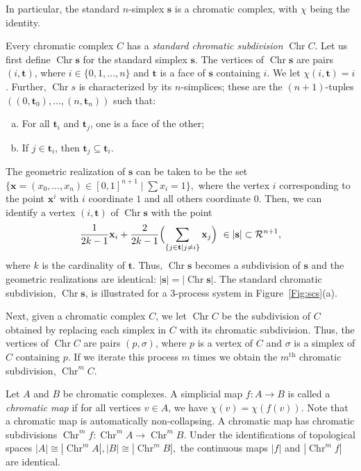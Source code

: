 \documentclass[a4paper]{article}
\def\R{\ensuremath{\mathcal{R}}}
\def\s {\mathbf{s}}
\def\t {\mathbf{t}}
\def\Chr{\operatorname{Chr}}
\def\x{\mathbf{x}}
\renewcommand\th{^{\text{th}}}
\begin{document}
In particular, the standard $n$-simplex $\s$ is a chromatic complex, with $\chi$ being the identity.

Every chromatic complex $C$ has a {\em standard chromatic subdivision} $\Chr C$. Let us first define $\Chr \s$
for the standard simplex $\s$. The vertices of $\Chr \s$ are pairs $(i, \t)$, where $i \in \{0,1 ,\dots, n\}$
and $\t$ is a face of $\s$ containing $i$. We let $\chi(i, \t) = i$. Further, $\Chr s$ is characterized by its
$n$-simplices; these are the $(n+1)$-tuples $((0,\t_0), \dots, (n, \t_n))$ such that:
\begin{enumerate}[(a)]
\item For all $\t_i$ and $\t_j$, one is a face of the other;
\item If $j \in \t_i$, then $\t_j \subseteq \t_i$. 
\end{enumerate} 
The geometric realization of $\s$ can be taken to be the set $\{\x=(x_0, \dots, x_n) \in [0,1]^{n+1} \mid \sum
x_i = 1\},$ where the vertex $i$ corresponding to the point $\x^i$ with $i$ coordinate $1$ and all others
coordinate $0$. Then, we can identify a vertex $(i, \t)$ of $\Chr \s$ with the point
\[
\frac{1}{2k-1} \x_i + \frac{2}{2k-1} \Bigl( \sum_{\{j \in \t \mid j \neq i\}} \x_j \Bigr) \ \in |\s| \subset
\R^{n+1},
\]
where $k$ is the cardinality of $\t$. 
Thus, $\Chr \s$ becomes a subdivision of $\s$ and the geometric realizations are identical: $|\s|=|\Chr \s|$. The standard chromatic subdivision, $\Chr\s$, is illustrated for a 3-process system in Figure~\ref{Fig:scs}(a).


Next, given a chromatic complex $C$, we let $\Chr C$ be the subdivision of $C$ obtained by replacing each
simplex in $C$ with its chromatic subdivision. Thus, the vertices of $\Chr C$ are pairs $(p, \sigma)$, where $p$
is a vertex of $C$ and $\sigma$ is a simplex of $C$ containing $p$. If we iterate this process  $m$ times we
obtain the $m\th$ chromatic subdivision, $\Chr^m C$.

Let $A$ and $B$ be chromatic complexes. A simplicial map $f: A \to B$ is called a {\em chromatic map} if for all
vertices $v \in A$, we have $\chi(v) = \chi(f(v))$. Note that a chromatic map is automatically non-collapsing. A
chromatic map has chromatic subdivisions $\Chr^m f: \Chr^m A \to \Chr^m B$. Under the identifications of
topological spaces $|A| \cong |\Chr^m A|, |B| \cong |\Chr^m B|,$ the continuous maps $|f|$ and $|\Chr^m f|$ are identical.
\end{document}
